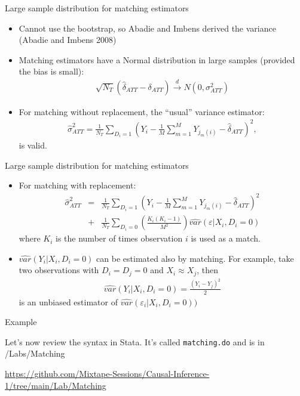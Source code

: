 \documentclass{beamer}
\begin{document}
\begin{frame}{Large sample distribution for matching estimators}
	
	\begin{itemize}
	\item Cannot use the bootstrap, so Abadie and Imbens derived the variance (Abadie and Imbens 2008)
	\item Matching estimators have a Normal distribution in large samples (provided the bias is small):
		\begin{eqnarray*}
		\sqrt{N_T} (\widehat{\delta}_{ATT} - \delta_{ATT}) \xrightarrow{d} N(0,\sigma^2_{ATT})
		\end{eqnarray*}
	\item For matching without replacement, the ``usual'' variance estimator:
		\begin{eqnarray*}
		\widehat{\sigma}^2_{ATT} = \frac{1}{N_T} \sum_{D_i=1} \left( Y_i - \frac{1}{M} \sum_{m=1}^M Y_{j_m(i)} - \widehat{\delta}_{ATT} \right)^2,
		\end{eqnarray*}is valid.
	\end{itemize}
\end{frame}

\begin{frame}{Large sample distribution for matching estimators}
	
	\begin{itemize}
	\item For matching with replacement:
		\begin{eqnarray*}
		\widehat{\sigma}^2_{ATT} &=& \frac{1}{N_T} \sum_{D_i=1} \left( Y_i - \frac{1}{M} \sum_{m=1}^M Y_{j_m(i)} - \widehat{\delta}_{ATT} \right)^2 \\
		&+& \frac{1}{N_T} \sum_{D_i=0} \left( \frac{K_i(K_i-1)}{M^2} \right) \widehat{var}(\varepsilon | X_i,D_i=0)
		\end{eqnarray*}where $K_i$ is the number of times observation $i$ is used as a match.
	\item $\widehat{var}(Y_i | X_i,D_i=0)$ can be estimated also by matching.  For example, take two observations with $D_i=D_j=0$ and $X_i \approx X_j$, then
		\begin{eqnarray*}
		\widehat{var}(Y_i | X_i,D_i=0) = \frac{(Y_i-Y_j)^2}{2}
		\end{eqnarray*}is an unbiased estimator of $\widehat{var}(\varepsilon_i | X_i,D_i=0))$
	\end{itemize}
\end{frame}

\begin{frame}{Example}

Let's now review the syntax in Stata.  It's called \texttt{matching.do} and is in /Labs/Matching 

\bigskip

\url{https://github.com/Mixtape-Sessions/Causal-Inference-1/tree/main/Lab/Matching}

\end{frame}
\end{document}
